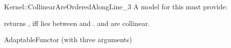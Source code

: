 \begin{ccRefFunctionObjectConcept}{Kernel::CollinearAreOrderedAlongLine_3}
A model for this must provide:


         {returns , iff  lies between  
          and . \ccPrecond {} and  are 
          collinear.}

\ccRefines
AdaptableFunctor (with three arguments)

\ccSeeAlso

  \\

\end{ccRefFunctionObjectConcept}
